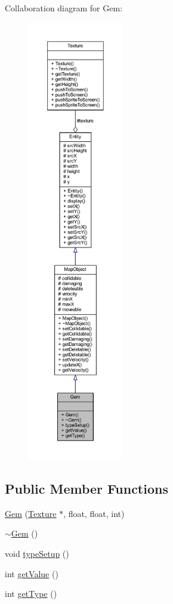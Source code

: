 Collaboration diagram for Gem\+:
\nopagebreak
\begin{figure}[H]
\begin{center}
\leavevmode
\includegraphics[height=550pt]{class_gem__coll__graph}
\end{center}
\end{figure}
\subsection*{Public Member Functions}
\begin{DoxyCompactItemize}
\item 
\hyperlink{class_gem_a9b964b4eacf579f4e9fa2e6006222ca4}{Gem} (\hyperlink{class_texture}{Texture} $\ast$, float, float, int)
\item 
\hyperlink{class_gem_a25c24193733a5c4b9c230e4164b08cd4}{$\sim$\+Gem} ()
\item 
void \hyperlink{class_gem_a5b88637e9b62fc71af306f58f5c82cef}{type\+Setup} ()
\item 
int \hyperlink{class_gem_acccf14e79a3e6a9db263081e88e953e1}{get\+Value} ()
\item 
int \hyperlink{class_gem_afee29c071abd184ecaa5eb8925066691}{get\+Type} ()
\end{DoxyCompactItemize}
